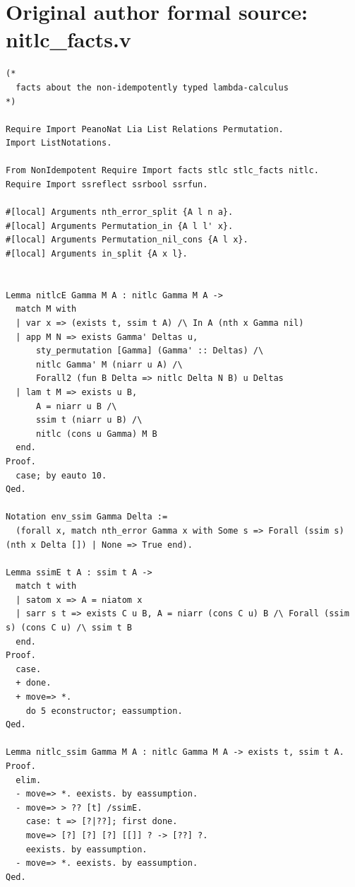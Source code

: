 \section*{Original author formal source: nitlc\_facts.v}
\begin{lstlisting}[style=authorcoq]
(*
  facts about the non-idempotently typed lambda-calculus
*)

Require Import PeanoNat Lia List Relations Permutation.
Import ListNotations.

From NonIdempotent Require Import facts stlc stlc_facts nitlc.
Require Import ssreflect ssrbool ssrfun.

#[local] Arguments nth_error_split {A l n a}.
#[local] Arguments Permutation_in {A l l' x}.
#[local] Arguments Permutation_nil_cons {A l x}.
#[local] Arguments in_split {A x l}.


Lemma nitlcE Gamma M A : nitlc Gamma M A ->
  match M with
  | var x => (exists t, ssim t A) /\ In A (nth x Gamma nil)
  | app M N => exists Gamma' Deltas u,
      sty_permutation [Gamma] (Gamma' :: Deltas) /\
      nitlc Gamma' M (niarr u A) /\
      Forall2 (fun B Delta => nitlc Delta N B) u Deltas
  | lam t M => exists u B,
      A = niarr u B /\
      ssim t (niarr u B) /\
      nitlc (cons u Gamma) M B
  end.
Proof.
  case; by eauto 10.
Qed.

Notation env_ssim Gamma Delta :=
  (forall x, match nth_error Gamma x with Some s => Forall (ssim s) (nth x Delta []) | None => True end).

Lemma ssimE t A : ssim t A ->
  match t with
  | satom x => A = niatom x
  | sarr s t => exists C u B, A = niarr (cons C u) B /\ Forall (ssim s) (cons C u) /\ ssim t B
  end.
Proof.
  case.
  + done.
  + move=> *.
    do 5 econstructor; eassumption.
Qed.

Lemma nitlc_ssim Gamma M A : nitlc Gamma M A -> exists t, ssim t A.
Proof.
  elim.
  - move=> *. eexists. by eassumption.
  - move=> > ?? [t] /ssimE.
    case: t => [?|??]; first done.
    move=> [?] [?] [?] [[]] ? -> [??] ?.
    eexists. by eassumption.
  - move=> *. eexists. by eassumption.
Qed.


\end{lstlisting}
